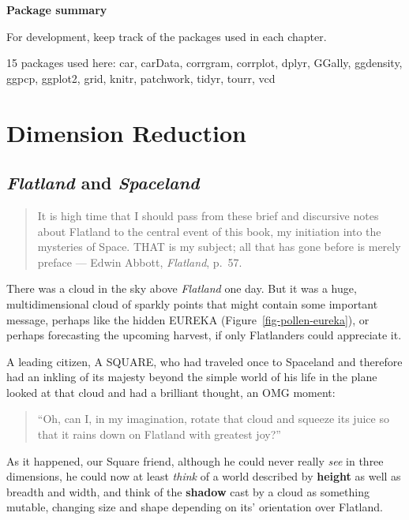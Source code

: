 \documentclass[
  letterpaper,
  10pt,
  krantz2]{krantz}
\begin{document}
\textbf{Package summary}

For development, keep track of the packages used in each chapter.

15 packages used here: car, carData, corrgram, corrplot, dplyr, GGally,
ggdensity, ggpcp, ggplot2, grid, knitr, patchwork, tidyr, tourr, vcd

\chapter{Dimension Reduction}\label{sec-pca-biplot}

\section{\texorpdfstring{\emph{Flatland} and
\emph{Spaceland}}{Flatland and Spaceland}}\label{sec-spaceland}

\begin{quote}
It is high time that I should pass from these brief and discursive notes
about Flatland to the central event of this book, my initiation into the
mysteries of Space. THAT is my subject; all that has gone before is
merely preface --- Edwin Abbott, \emph{Flatland}, p.~57.
\end{quote}

There was a cloud in the sky above \emph{Flatland} one day. But it was a
huge, multidimensional cloud of sparkly points that might contain some
important message, perhaps like the hidden EUREKA
(Figure~\ref{fig-pollen-eureka}), or perhaps forecasting the upcoming
harvest, if only Flatlanders could appreciate it.

A leading citizen, A SQUARE, who had traveled once to Spaceland and
therefore had an inkling of its majesty beyond the simple world of his
life in the plane looked at that cloud and had a brilliant thought, an
OMG moment:

\begin{quote}
``Oh, can I, in my imagination, rotate that cloud and squeeze its juice
so that it rains down on Flatland with greatest joy?''
\end{quote}

As it happened, our Square friend, although he could never really
\emph{see} in three dimensions, he could now at least \emph{think} of a
world described by \textbf{height} as well as breadth and width, and
think of the \textbf{shadow} cast by a cloud as something mutable,
changing size and shape depending on its' orientation over Flatland.
\end{document}
